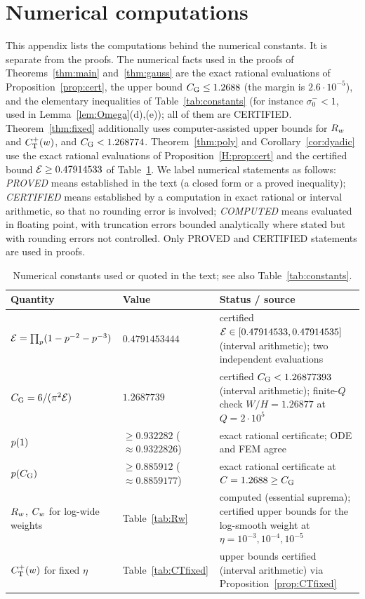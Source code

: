 \documentclass[11pt]{amsart}
\theoremstyle{definition}
\theoremstyle{remark}
\numberwithin{equation}{section}
\begin{document}
\section{Numerical computations}\label{app:numerics}
This appendix lists the computations behind the numerical constants. It is separate from the proofs. The numerical facts used in the proofs of Theorems~\ref{thm:main} and~\ref{thm:gauss} are the exact rational evaluations of Proposition~\ref{prop:cert}, the upper bound $C_{\mathrm G}\le1.2688$ (the margin is $2.6\cdot10^{-5}$), and the elementary inequalities of Table~\ref{tab:constants} (for instance $\sigma_0^-<1$, used in Lemma~\ref{lem:Omega}(d),(e)); all of them are CERTIFIED. Theorem~\ref{thm:fixed} additionally uses computer-assisted upper bounds for $R_w$ and $C^{+}_{\mathrm T}(w)$, and $C_{\mathrm G}<1.268774$. Theorem~\ref{thm:poly} and Corollary~\ref{cor:dyadic} use the exact rational evaluations of Proposition~\ref{H:prop:cert} and the certified bound $\mathcal E\ge0.47914533$ of Table~\ref{tab:numerics}. We label numerical statements as follows: \emph{PROVED} means established in the text (a closed form or a proved inequality); \emph{CERTIFIED} means established by a computation in exact rational or interval arithmetic, so that no rounding error is involved; \emph{COMPUTED} means evaluated in floating point, with truncation errors bounded analytically where stated but with rounding errors not controlled. Only PROVED and CERTIFIED statements are used in proofs.

\begin{table}[ht]
\centering\small
\begin{tabular}{@{}ll>{\raggedright\arraybackslash}p{5.2cm}@{}}
\toprule
Quantity & Value & Status / source\\
\midrule
$\mathcal E=\prod_p(1-p^{-2}-p^{-3})$ & $0.4791453444$ & certified $\mathcal E\in[0.47914533,0.47914535]$ (interval arithmetic); two independent evaluations\\
$C_{\mathrm G}=6/(\pi^2\mathcal E)$ & $1.2687739$ & certified $C_{\mathrm G}<1.26877393$ (interval arithmetic); finite-$Q$ check $W/H=1.26877$ at $Q=2\cdot10^5$\\
$p(1)$ & $\ge0.932282$ ($\approx0.9322826$) & exact rational certificate; ODE and FEM agree\\
$p(C_{\mathrm G})$ & $\ge0.885912$ ($\approx0.8859177$) & exact rational certificate at $C=1.2688\ge C_{\mathrm G}$\\
$R_w$, $C_w$ for log-wide weights & Table~\ref{tab:Rw} & computed (essential suprema); certified upper bounds for the log-smooth weight at $\eta=10^{-3},10^{-4},10^{-5}$\\
$C^{+}_{\mathrm T}(w)$ for fixed $\eta$ & Table~\ref{tab:CTfixed} & upper bounds certified (interval arithmetic) via Proposition~\ref{prop:CTfixed}\\
\bottomrule
\end{tabular}
\caption{Numerical constants used or quoted in the text; see also Table~\ref{tab:constants}.}\label{tab:numerics}
\end{table}
\end{document}
